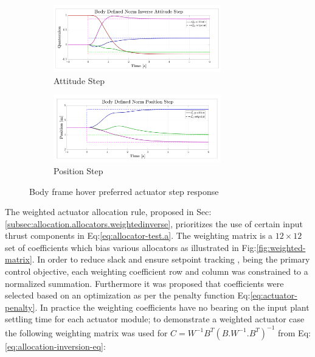 \par
\begin{figure}[hbtp]
\centering
\begin{subfigure}{\textwidth}
\centering
\includegraphics[width=0.8\textwidth]{graphs/body_norm_attitude}
\vspace{-12pt}
\caption{Attitude Step}
\label{fig:body_norm_attitude}
\end{subfigure}
\begin{subfigure}{\textwidth}
\vspace{-3pt}
\centering
\includegraphics[width=0.8\textwidth]{graphs/body_norm_position}
\vspace{-12pt}
\caption{Position Step}
\label{fig:body_norm_position}
\end{subfigure}
\vspace{-8pt}
\caption{Body frame hover preferred actuator step response}
\label{fig:body-norm-step}
\vspace{-16pt}
\end{figure}
\par
The weighted actuator allocation rule, proposed in Sec:\ref{subsec:allocation.allocators.weightedinverse}, prioritizes the use of certain input thrust components in Eq:\ref{eq:allocator-test.a}. The weighting matrix is a $12\times 12$ set of coefficients which bias various allocators as illustrated in Fig:\ref{fig:weighted-matrix}. In order to reduce slack and ensure setpoint tracking , being the primary control objective, each weighting coefficient row and column was constrained to a normalized summation. Furthermore it was proposed that coefficients were selected based on an optimization as per the penalty function Eq:\ref{eq:actuator-penalty}. In practice the weighting coefficients have no bearing on the input plant settling time for each actuator module; to demonstrate a weighted actuator case the following weighting matrix was used for $C=W^{-1}B^T(B.W^{-1}.B^T)^{-1}$ from Eq:\ref{eq:allocation-inversion-eq}:
